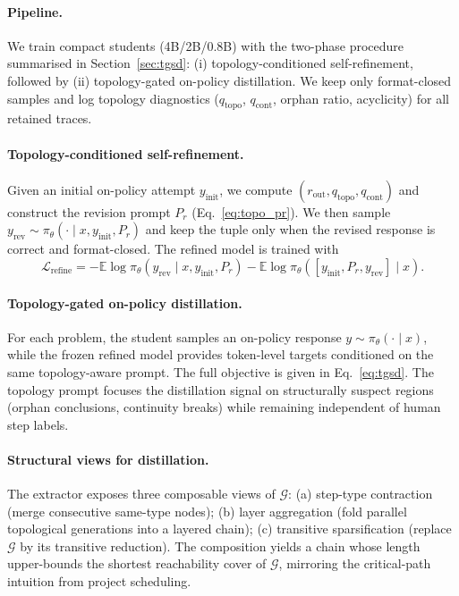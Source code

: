 \paragraph{Pipeline.}
We train compact students (4B/2B/0.8B) with the two-phase \framework procedure summarised in Section~\ref{sec:tgsd}:
(i) topology-conditioned self-refinement, followed by
(ii) topology-gated on-policy distillation.
We keep only format-closed samples and log topology diagnostics ($q_{\mathrm{topo}}$, $q_{\mathrm{cont}}$, orphan ratio, acyclicity) for all retained traces.

\paragraph{Topology-conditioned self-refinement.}
Given an initial on-policy attempt $y_{\mathrm{init}}$, we compute $(r_{\mathrm{out}},q_{\mathrm{topo}},q_{\mathrm{cont}})$ and construct the revision prompt $P_r$ (Eq.~\ref{eq:topo_pr}).
We then sample $y_{\mathrm{rev}}\!\sim\!\pi_\theta(\cdot\mid x,y_{\mathrm{init}},P_r)$ and keep the tuple only when the revised response is correct and format-closed.
The refined model is trained with
\begin{equation}
\label{eq:srt}
\mathcal{L}_{\mathrm{refine}} =
-\mathbb{E}\log\pi_\theta(y_{\mathrm{rev}}\mid x,y_{\mathrm{init}},P_r)
-\mathbb{E}\log\pi_\theta([y_{\mathrm{init}},P_r,y_{\mathrm{rev}}]\mid x).
\end{equation}

\paragraph{Topology-gated on-policy distillation.}
For each problem, the student samples an on-policy response $y\!\sim\!\pi_\theta(\cdot\mid x)$, while the frozen refined model provides token-level targets conditioned on the same topology-aware prompt.
The full objective is given in Eq.~\ref{eq:tgsd}.
The topology prompt focuses the distillation signal on structurally suspect regions (orphan conclusions, continuity breaks) while remaining independent of human step labels.

\paragraph{Structural views for distillation.}
The extractor exposes three composable views of $\mathcal{G}$:
(a) step-type contraction (merge consecutive same-type nodes);
(b) layer aggregation (fold parallel topological generations into a layered chain);
(c) transitive sparsification (replace $\mathcal{G}$ by its transitive reduction).
The composition yields a chain whose length upper-bounds the shortest reachability cover of $\mathcal{G}$, mirroring the critical-path intuition from project scheduling.
